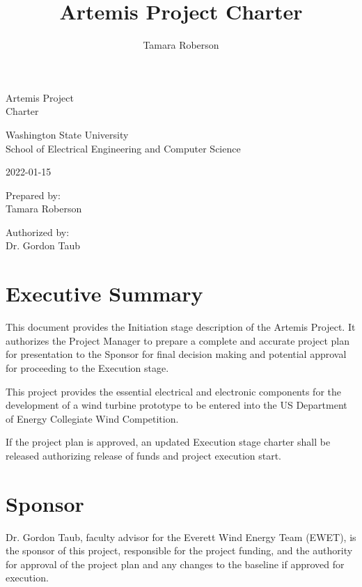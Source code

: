 \documentclass[11pt,letterpaper]{article}
\begin{document}
\title{Artemis Project Charter}
\author{Tamara Roberson}

\begin{center}
    \vspace*{5cm}

    {\Huge Artemis Project \\
        Charter}

    \vspace*{1cm}

    Washington State University \\
    School of Electrical Engineering and Computer Science

    \vspace*{1cm}

    2022-01-15

    \vspace*{1cm}

    Prepared by: \\
    Tamara Roberson
    \vspace*{1cm}

    Authorized by: \\
    Dr. Gordon Taub
\end{center}
\clearpage

\tableofcontents

\clearpage

\section{Executive Summary}
This document provides the Initiation stage description of the Artemis
Project. It authorizes the Project Manager to prepare a complete and accurate
project plan for presentation to the Sponsor for final decision making and
potential approval for proceeding to the Execution stage.

This project provides the essential electrical and electronic components for
the development of a wind turbine prototype to be entered into the US Department
of Energy Collegiate Wind Competition.

If the project plan is approved, an updated Execution stage charter shall be released authorizing release of funds and project execution start.

\section{Sponsor}
Dr. Gordon Taub, faculty advisor for the Everett Wind Energy Team (EWET), is
the sponsor of this project, responsible for the project funding, and the
authority for approval of the project plan and any changes to the baseline if
approved for execution.
\end{document}
